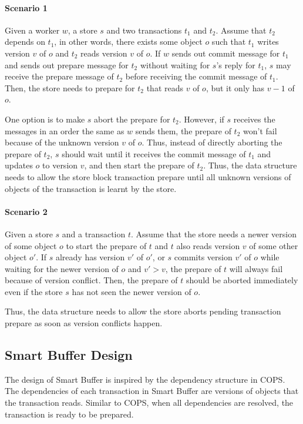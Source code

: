 \documentclass{article}
\begin{document}
\paragraph{Scenario 1} Given a worker $w$, a store $s$ and two transactions $t_1$
and $t_2$. Assume that $t_2$ depends on $t_1$, in other words, there exists some
object $o$ such that $t_1$ writes version $v$ of $o$ and $t_2$ reads version $v$
of $o$. If $w$ sends out commit message for $t_1$ and sends out prepare message
for $t_2$ without waiting for $s$'s reply for $t_1$, $s$ may receive the prepare
message of $t_2$ before receiving the commit message of $t_1$. Then, the store
needs to prepare for $t_2$ that reads $v$ of $o$, but it only has $v - 1$ of
$o$. 

One option is to make $s$ abort the prepare for $t_2$. However, if $s$ receives
the messages in an order the same as $w$ sends them, the prepare of $t_2$ won't
fail because of the unknown version $v$ of $o$. Thus, instead of directly
aborting the prepare of $t_2$, $s$ should wait until it receives the commit
message of $t_1$ and updates $o$ to version $v$, and then start the prepare of
$t_2$. Thus, the data structure needs to allow the store block transaction
prepare until all unknown versions of objects of the transaction is learnt by
the store.

\paragraph{Scenario 2} Given a store $s$ and a transaction $t$. Assume that the
store needs a newer version of some object $o$ to start the prepare of $t$ and
$t$ also reads version $v$ of some other object $o'$. If $s$ already has version
$v'$ of $o'$, or $s$ commits version $v'$ of $o$ while waiting for the newer
version of $o$ and $v' > v$, the prepare of $t$ will always fail because of
version conflict. Then, the prepare of $t$ should be aborted immediately even if
the store $s$ has not seen the newer version of $o$. 

Thus, the data structure needs to allow the store aborts pending transaction
prepare as soon as version conflicts happen.

\subsection{Smart Buffer Design}
The design of Smart Buffer is inspired by the dependency structure in COPS. The
dependencies of each transaction in Smart Buffer are versions of objects that 
the transaction reads. Similar to COPS, when all dependencies are resolved, the
transaction is ready to be prepared.
\end{document}
